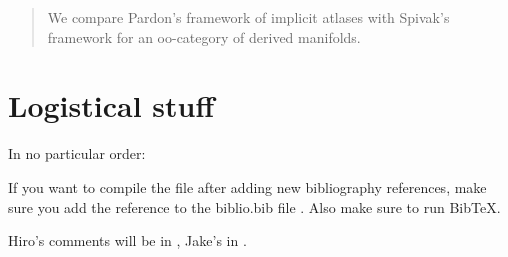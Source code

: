 \documentclass[12pt]{article}
\title{}
\author{Jacob McNamara and Hiro Lee Tanaka}
\theoremstyle{definition}
\begin{document}
\maketitle

\begin{abstract}
We compare Pardon's framework of implicit atlases with Spivak's framework for an oo-category of derived manifolds.
\end{abstract}

\section{Logistical stuff}
In no particular order:
\enum
	\item
		If you want to compile the file after adding new bibliography references, make sure you add the reference to the biblio.bib file . Also make sure to run BibTeX.
	\item
		Hiro's comments will be in , Jake's in .
\enumd








\end{document}
